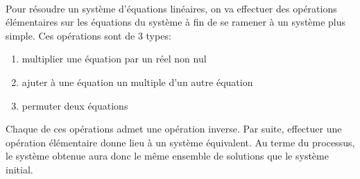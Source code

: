 \paragraph{} Pour résoudre un système d'équations linéaires, on va effectuer des opérations élémentaires sur les équations du système à fin de se ramener à un système plus simple. Ces opérations sont de 3 types:
\begin{enumerate}[ a)]
  \item multiplier une équation par un réel non nul
  \item ajuter à une équation un multiple d'un autre équation
  \item permuter deux équations
\end{enumerate}

Chaque de ces opérations admet une opération inverse. Par suite, effectuer une opération élémentaire donne lieu à un système équivalent. Au terme du processus, le système obtenue aura donc le même ensemble de solutions que le système initial.

